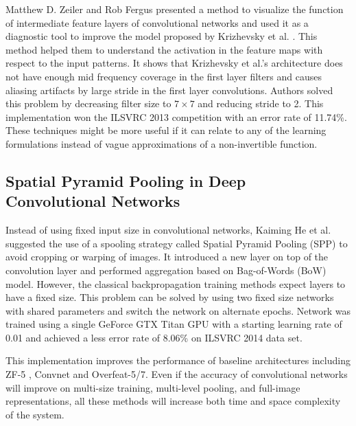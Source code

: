 \documentclass{article}
\begin{document}
Matthew D. Zeiler and Rob Fergus \cite{Zeiler2013} presented a method to visualize the function of intermediate feature layers of convolutional networks and used it as a diagnostic tool to improve  the model proposed by Krizhevsky et al. \cite{Krizhevsky2012a}. This method helped  them  to understand  the activation in the feature maps with respect to the input patterns. It shows that Krizhevsky et al.'s architecture does not have  enough mid frequency coverage in the first layer filters and causes aliasing artifacts by large stride in the first layer convolutions. Authors solved this problem by decreasing filter size to $7\times7$ and reducing stride to 2. This implementation won the  ILSVRC 2013 competition with an error rate of 11.74\%. These  techniques might be more useful if it can relate to any of the learning formulations instead of vague approximations of a non-invertible function.



\subsection{Spatial Pyramid Pooling in Deep Convolutional Networks}
Instead of using fixed input size in convolutional networks, Kaiming He et al. \cite{He2014} suggested  the use of a spooling strategy called  Spatial Pyramid Pooling (SPP) \cite{Grauman2005} \cite{1641019} to avoid cropping or warping of images. It introduced a new layer on top of the convolution layer and performed aggregation  based on Bag-of-Words (BoW) model. However, the classical backpropagation training methods expect layers to have a fixed   size.  This problem can be solved by using two fixed size networks with shared parameters and switch the network on alternate epochs. Network was trained using a single GeForce GTX Titan GPU with a starting  learning rate of 0.01 and achieved  a less  error rate of 8.06\% on  ILSVRC 2014 data set. 
\par 
This implementation improves the performance of baseline architectures including ZF-5 \cite{Zeiler2013}, Convnet \cite{Krizhevsky2012a} and Overfeat-5/7. Even if  the accuracy of convolutional networks will improve on multi-size training, multi-level pooling, and full-image representations, all these methods will increase both time and space complexity of the system.
%
\end{document}

